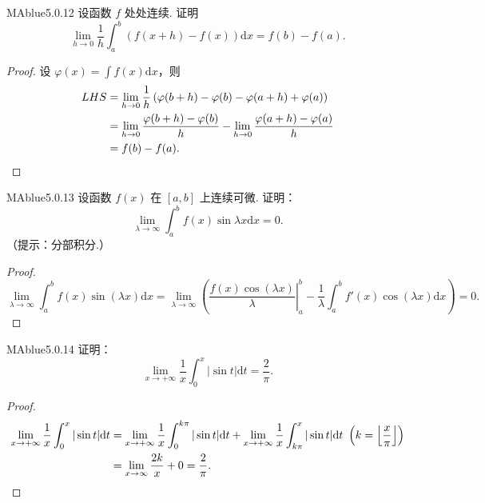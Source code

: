 \begin{problem}{MAblue}{5.0.12}
    设函数 $f$ 处处连续. 证明
    \[
        \lim_{h \to 0} \frac 1 h \int_a^b \left( f(x+h)-f(x) \right) \mathrm dx = f(b) - f(a).
    \]
\end{problem}

\begin{proof}
    设 $\varphi(x) = \int f(x) \mathrm dx$，则
    \begin{align*}
        LHS &= \lim_{h \to 0} \frac 1 h \left( \varphi(b+h) - \varphi(b) - \varphi(a+h) + \varphi(a) \right) \\
        &= \lim_{h \to 0} \frac {\varphi(b+h) - \varphi(b)} h - \lim_{h \to 0} \frac {\varphi(a+h) - \varphi(a)} h \\
        &= f(b) - f(a). \qedhere
    \end{align*}
\end{proof}

\begin{problem}{MAblue}{5.0.13}
    设函数 $f(x)$ 在 $[a, b]$ 上连续可微. 证明：
    \[
        \lim_{\lambda \to \infty} \int_a^b f(x) \sin \lambda x \mathrm dx = 0.
    \]
    （提示：分部积分.）
\end{problem}

\begin{proof}
    \[
        \lim_{\lambda \to \infty} \int_a^b f(x) \sin(\lambda x) \mathrm dx = \lim_{\lambda \to \infty} \left( \left. \frac {f(x) \cos(\lambda x)} \lambda \right|_a^b - \frac 1 \lambda \int_a^b f'(x) \cos(\lambda x) \mathrm dx \right) = 0.
    \]
\end{proof}

\begin{problem}{MAblue}{5.0.14}
    证明：
    \[
        \lim_{x \to +\infty} \frac 1 x \int_0^x |\sin t| \mathrm dt = \frac 2 \pi.
    \]
\end{problem}

\begin{proof}
    \begin{align*}
        \lim_{x \to +\infty} \frac 1 x \int_0^{x} |\sin t| \mathrm dt &= \lim_{x \to +\infty} \frac 1 x \int_0^{k\pi} |\sin t| \mathrm dt + \lim_{x \to +\infty} \frac 1 x \int_{k\pi}^x |\sin t| \mathrm dt \ \left( k = \left\lfloor \frac x \pi \right\rfloor \right) \\
        &= \lim_{x \to \infty} \frac {2k} x + 0 = \frac 2 \pi. \qedhere
    \end{align*}
\end{proof}

